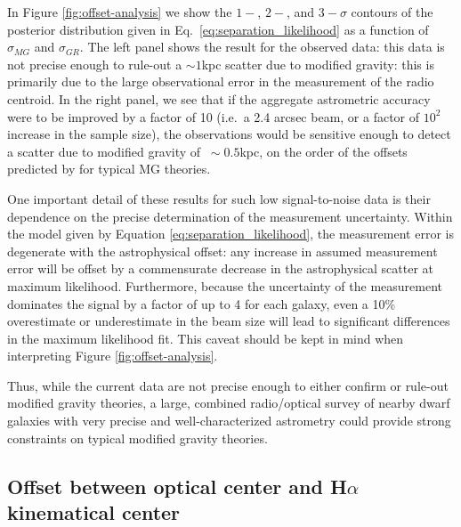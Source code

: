 \documentclass[useAMS,usenatbib,twocolumn]{mn2e}
\newcommand{\ha}{H$\alpha$}
\begin{document}
In Figure \ref{fig:offset-analysis} we show the $1-$, $2-$, and $3-\sigma$
contours
of the posterior distribution given in Eq.~\ref{eq:separation_likelihood}
as a function of $\sigma_{MG}$ and $\sigma_{GR}$.  The left panel shows the
result for the observed data: this data is
not precise enough to rule-out a $\sim 1$kpc scatter due to modified
gravity: this is primarily due to the large observational error in the
measurement of the radio centroid.  In the right panel, we see that
if the aggregate astrometric accuracy were to be improved by a factor of 10
(i.e.\ a 2.4 arcsec beam, or a factor of $10^2$ increase in the sample size),
the observations would be sensitive enough to detect a scatter due to
modified gravity of $~\sim 0.5$kpc, on the order of the offsets
predicted by \citep{bhuvjake2011} for typical MG theories.

One important detail of these results for such low signal-to-noise data
is their dependence on
the precise determination of the measurement uncertainty.  Within the model
given by Equation \ref{eq:separation_likelihood}, the measurement error is
degenerate with the astrophysical offset: any increase in assumed measurement
error will be offset by a commensurate decrease in the astrophysical scatter
at maximum likelihood.  Furthermore, because the uncertainty of the measurement
dominates the signal by a factor of up to 4 for each galaxy, even a 10\%
overestimate or underestimate in the beam size will lead to significant
differences in the maximum likelihood fit.  This caveat should be kept in
mind when interpreting Figure \ref{fig:offset-analysis}.

Thus, while the current data are not precise enough to either confirm or
rule-out modified gravity theories, a large, combined radio/optical survey of
nearby dwarf galaxies with very precise and well-characterized astrometry
could provide strong constraints on typical modified gravity theories.


\subsection{Offset between optical center and \ha{} kinematical center}
\label{sec:kinematical}
\end{document}
